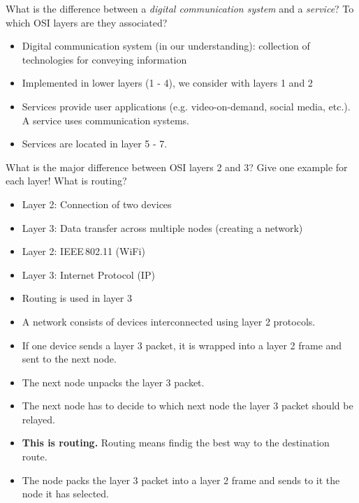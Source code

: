\begin{question}[subtitle={OSI Layers}]
	What is the difference between a \emph{digital communication system} and a \emph{service}? To which OSI layers are they associated?
\end{question}

\begin{solution}
	\begin{itemize}
		\item Digital communication system (in our understanding): collection of technologies for conveying information
		\item Implemented in lower layers (1 - 4), we consider with layers 1 and 2
		\item Services provide user applications (e.g. video-on-demand, social media, etc.). A service uses communication systems.
		\item Services are located in layer 5 - 7.
	\end{itemize}
\end{solution}

\begin{question}[subtitle={Networks}]
	\begin{tasks}
		\task
		What is the major difference between OSI layers 2 and 3?
		\task
		Give one example for each layer!
		\task
		What is routing?
	\end{tasks}
\end{question}

\begin{solution}
	\begin{tasks}
		\task
		\begin{itemize}
			\item Layer 2: Connection of two devices
			\item Layer 3: Data transfer across multiple nodes (creating a network)
		\end{itemize}
		\task
		\begin{itemize}
			\item Layer 2: IEEE\,802.11 (WiFi)
			\item Layer 3: Internet Protocol (IP)
		\end{itemize}
		\task
		\begin{itemize}
			\item Routing is used in layer 3
			\item A network consists of devices interconnected using layer 2 protocols.
			\item If one device sends a layer 3 packet, it is wrapped into a layer 2 frame and sent to the next node.
			\item The next node unpacks the layer 3 packet.
			\item The next node has to decide to which next node the layer 3 packet should be relayed.
			\item \textbf{This is routing.} Routing means findig the best way to the destination route.
			\item The node packs the layer 3 packet into a layer 2 frame and sends to it the node it has selected.
		\end{itemize}
	\end{tasks}
\end{solution}
